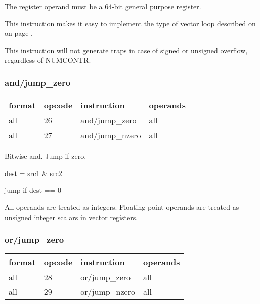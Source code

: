 \documentclass[forwardcom.tex]{subfiles}
\begin{document}
The register operand must be a 64-bit general purpose register.
\vspace{2mm}

This instruction makes it easy to implement the type of vector loop described on on page \pageref{vectorLoops}.
\vspace{2mm}

This instruction will not generate traps in case of signed or unsigned overflow, regardless of NUMCONTR.
\vspace{2mm}


\subsubsection{and/jump\_zero}
\label{table:andJumpZeroInstruction}
\begin{tabular}{|p{16mm}|p{12mm}|p{60mm}|p{50mm}|}
\hline
\bfseries format & \bfseries opcode & \bfseries instruction & \bfseries operands \\ \hline
all & 26 & and/jump\_zero & all \\ \hline
all & 27 & and/jump\_nzero & all \\ \hline
\end{tabular}
\vspace{2mm}

Bitwise and. Jump if zero.
\vspace{2mm}

dest = src1 \& src2

jump if dest == 0
\vspace{2mm}

All operands are treated as integers. 
Floating point operands are treated as unsigned integer scalars in vector registers.
\vspace{2mm}

\subsubsection{or/jump\_zero}
\label{table:orJumpZeroInstruction}
\begin{tabular}{|p{16mm}|p{12mm}|p{60mm}|p{50mm}|}
\hline
\bfseries format & \bfseries opcode & \bfseries instruction & \bfseries operands \\ \hline
all & 28 & or/jump\_zero & all \\ \hline
all & 29 & or/jump\_nzero & all \\ \hline
\end{tabular}
\vspace{2mm}
\end{document}

